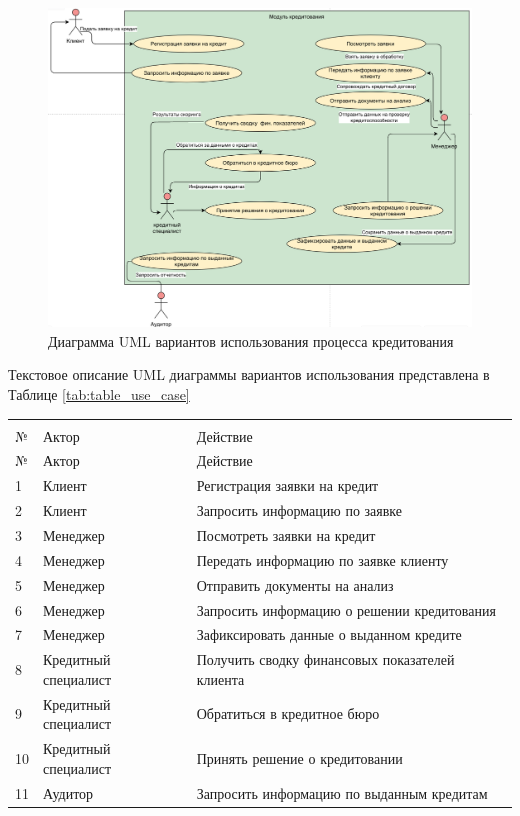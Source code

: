 \documentclass[14pt, a4paper]{extarticle}
\begin{document}
\begin{figure}[H]
	\centering
	\includegraphics[width=\textwidth]{uml_use_case_extended}
	\caption{Диаграмма UML вариантов использования процесса кредитования}
	\label{fig:uml_use_case}
\end{figure}

Текстовое описание UML диаграммы вариантов использования представлена в Таблице
\ref{tab:table_use_case}

\begin{tabularx}{\textwidth}{|l|X|X|}
	\captionsetup{margin=-14pt}
	\caption{Текстовое описание вариантов использования\label{tab:table_use_case}}
		\\
	\endfirsthead
	\caption*{Продолжение таблицы~\ref{tab:table_use_case}} \\
	\hline
	№ & Актор 		       	  & Действие 					 				  \\\hline
	\endhead
	\endfoot
	\endlastfoot

	\hline
	№  & Актор 				  & Действие 					 				  \\\hline
	1  & Клиент 			  & Регистрация заявки на кредит  				  \\\hline
	2  & Клиент 			  & Запросить информацию по заявке 				  \\\hline
	3  & Менеджер 			  & Посмотреть заявки на кредит   				  \\\hline
	4  & Менеджер 			  & Передать информацию по заявке клиенту   	  \\\hline
	5  & Менеджер 			  & Отправить документы на анализ   			  \\
	6  & Менеджер 			  & Запросить информацию о решении кредитования   \\\hline
	7  & Менеджер 			  & Зафиксировать данные о выданном кредите   	  \\\hline
	8  & Кредитный специалист & Получить сводку финансовых показателей клиента\\\hline
	9  & Кредитный специалист & Обратиться в кредитное бюро 				  \\\hline
	10 & Кредитный специалист & Принять решение о кредитовании 			 	  \\\hline
	11 & Аудитор 	 		  & Запросить информацию по выданным кредитам 	  \\\hline
\end{tabularx}
\end{document}
